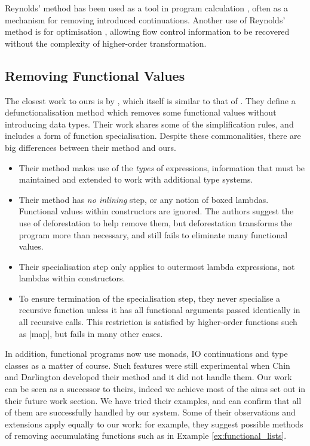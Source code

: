 \documentclass{sigplanconf}
\begin{document}
Reynolds' method has been used as a tool in program calculation \cite{danvy:defunctionalization_at_work,hutton:calculating_an_exceptional_machine}, often as a mechanism for removing introduced continuations. Another use of Reynolds' method is for optimisation \cite{jhc}, allowing flow control information to be recovered without the complexity of higher-order transformation.

\subsection{Removing Functional Values}

The closest work to ours is by \citet{chin:higher_order_removal}, which itself is similar to that of \citet{nelan:firstification}. They define a defunctionalisation method which removes some functional values without introducing data types. Their work shares some of the simplification rules, and includes a form of function specialisation. Despite these commonalities, there are big differences between their method and ours.

\begin{itemize}
\item Their method makes use of the \textit{types} of expressions, information that must be maintained and extended to work with additional type systems.
\item Their method has \textit{no inlining} step, or any notion of boxed lambdas. Functional values within constructors are ignored. The authors suggest the use of deforestation \cite{wadler:deforestation} to help remove them, but deforestation transforms the program more than necessary, and still fails to eliminate many functional values.
\item Their specialisation step only applies to outermost lambda expressions, not lambdas within constructors.
\item To ensure termination of the specialisation step, they never specialise a recursive function unless it has all functional arguments passed identically in all recursive calls. This restriction is satisfied by higher-order functions such as |map|, but fails in many other cases.
\end{itemize}

In addition, functional programs now use monads, IO continuations and type classes as a matter of course. Such features were still experimental when Chin and Darlington developed their method and it did not handle them. Our work can be seen as a successor to theirs, indeed we achieve most of the aims set out in their future work section. We have tried their examples, and can confirm that all of them are successfully handled by our system. Some of their observations and extensions apply equally to our work: for example, they suggest possible methods of removing accumulating functions such as in Example \ref{ex:functional_lists}.
\end{document}
